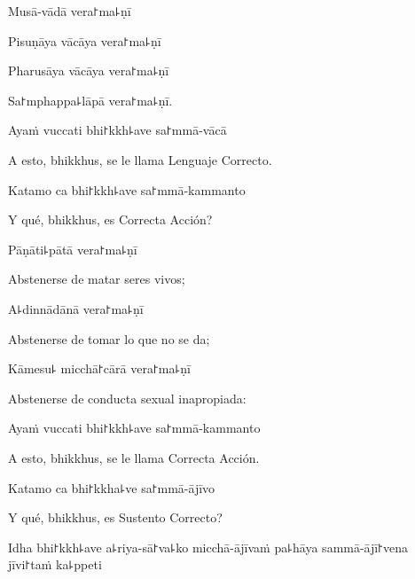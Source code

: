 Musā-vādā vera꜓ma꜕ṇī


Pisuṇāya vācāya vera꜓ma꜕ṇī


Pharusāya vācāya vera꜓ma꜕ṇī


Sa꜓mphappa꜕lāpā vera꜓ma꜕ṇī.


\ifaivedition
\clearpage
\fi

Ayaṁ vuccati bhi꜓kkh꜕ave sa꜓mmā-vācā

\begin{english}
	A esto, bhikkhus, se le llama Lenguaje Correcto.
\end{english}

Katamo ca bhi꜓kkh꜕ave sa꜓mmā-kammanto

\begin{english}
	Y qué, bhikkhus, es Correcta Acción?
\end{english}

Pāṇāti꜕pātā vera꜓ma꜕ṇī

\begin{english}
	Abstenerse de matar seres vivos;
\end{english}

A꜕dinnādānā vera꜓ma꜕ṇī

\begin{english}
	Abstenerse de tomar lo que no se da;
\end{english}

Kāmesu꜕ micchā꜓cārā vera꜓ma꜕ṇī

\begin{english}
	Abstenerse de conducta sexual inapropiada:
\end{english}

Ayaṁ vuccati bhi꜓kkh꜕ave sa꜓mmā-kammanto

\begin{english}
	A esto, bhikkhus, se le llama Correcta Acción.
\end{english}

Katamo ca bhi꜓kkha꜕ve sa꜓mmā-ājīvo

\begin{english}
	Y qué, bhikkhus, es Sustento Correcto?
\end{english}

Idha bhi꜓kkh꜕ave a꜕riya-sā꜓va꜕ko micchā-ājīvaṁ pa꜕hāya sammā-ājī꜓vena jīvi꜓taṁ ka꜕ppeti

